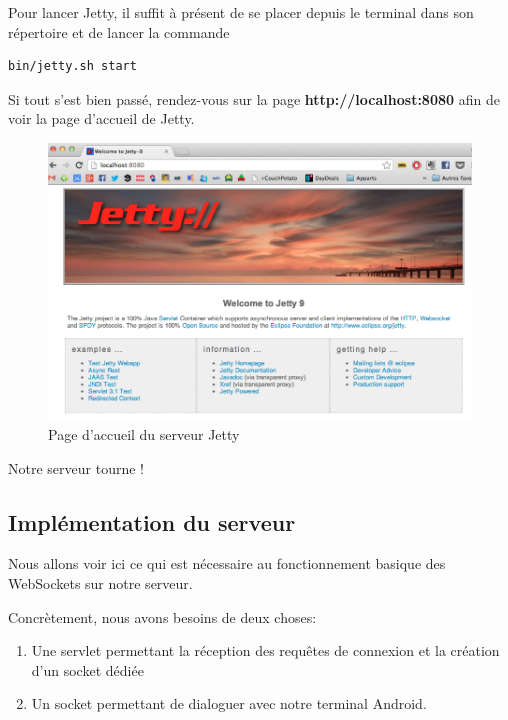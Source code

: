 \medskip

Pour lancer Jetty, il suffit à présent de se placer depuis le terminal dans son répertoire et de lancer la commande 

\begin{lstlisting}[caption={Commande de lancement de Jetty}]
bin/jetty.sh start
\end{lstlisting}

\medskip

Si tout s'est bien passé, rendez-vous sur la page \textbf{http://localhost:8080} afin de voir la page d'accueil de Jetty.

\begin{figure}[H]
      \centering
      \includegraphics[width=\textwidth]{00_media/welcome_jetty}
      \caption{Page d'accueil du serveur Jetty}
      \label{gra:maqmenu}
\end{figure}

\medskip

Notre serveur tourne !

\subsection{Implémentation du serveur}
Nous allons voir ici ce qui est nécessaire au fonctionnement basique des WebSockets sur notre serveur.

Concrètement, nous avons besoins de deux choses:
\begin{enumerate}
	\item Une servlet permettant la réception des requêtes de connexion et la création d'un socket dédiée
	\item Un socket permettant de dialoguer avec notre terminal Android.
\end{enumerate}

